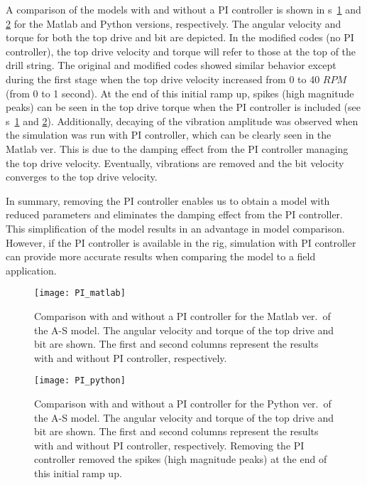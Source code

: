 A comparison of the models with and without a PI controller is shown in \figurename{}s~\ref{figure_topdriveremove_Matlab} and \ref{figure_topdriveremove} for the Matlab and Python versions, respectively. The angular velocity and torque for both the top drive and bit are depicted. In the modified codes (no PI controller), the top drive velocity and torque will refer to those at the top of the drill string. The original and modified codes showed similar behavior except during the first stage when the top drive velocity increased from 0 to 40 $RPM$ (from 0 to 1 second). At the end of this initial ramp up, spikes (high magnitude peaks) can be seen in the top drive torque when the PI controller is included (see \figurename{}s~\ref{figure_topdriveremove_Matlab} and \ref{figure_topdriveremove}). Additionally, decaying of the vibration amplitude was observed when the simulation was run with PI controller, which can be clearly seen in the Matlab ver. This is due to the damping effect from the PI controller managing the top drive velocity. Eventually, vibrations are removed and the bit velocity converges to the top drive velocity.

In summary, removing the PI controller enables us to obtain a model with reduced parameters and eliminates the damping effect from the PI controller. This simplification of the model results in an advantage in model comparison. However, if the PI controller is available in the rig, simulation with PI controller can provide more accurate results when comparing the model to a field application.
\begin{figure}
  \centering
  \texttt{[image: PI\_matlab]}
  \caption[Comparison with and without a PI controller for the Matlab ver.\ of the A-S model]{Comparison with and without a PI controller for the Matlab ver.\ of the A-S model. The angular velocity and torque of the top drive and bit are shown. The first and second columns represent the results with and without PI controller, respectively.}
  \label{figure_topdriveremove_Matlab}
\end{figure}

\begin{figure}
  \centering
  \texttt{[image: PI\_python]}
  \caption[Comparison with and without a PI controller for the Python ver.\ of the A-S model]{Comparison with and without a PI controller for the Python ver.\ of the A-S model. The angular velocity and torque of the top drive and bit are shown. The first and second columns represent the results with and without PI controller, respectively. Removing the PI controller removed the spikes (high magnitude peaks) at the end of this initial ramp up.}
  \label{figure_topdriveremove}
\end{figure}

